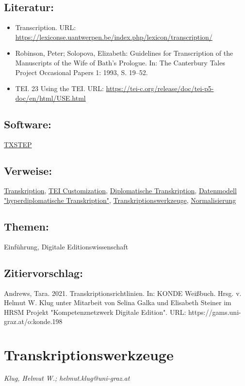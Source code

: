 \documentclass{article}
\begin{document}
        \subsection*{Literatur:}\begin{itemize}\item Transcription. URL: \url{https://lexiconse.uantwerpen.be/index.php/lexicon/transcription/}\item Robinson, Peter; Solopova, Elizabeth: Guidelines for Transcription of the Manuscripts of the
                              Wife of Bath’s Prologue. In: The Canterbury Tales Project Occasional Papers 1: 1993, S. 19–52.\item TEI. 23 Using the TEI. URL: \url{https://tei-c.org/release/doc/tei-p5-doc/en/html/USE.html}\end{itemize}\subsection*{Software:}\href{http://www.txstep.de}{TXSTEP}\subsection*{Verweise:}\href{https://gams.uni-graz.at/o:konde.197}{Transkription}, \href{https://gams.uni-graz.at/o:konde.180}{TEI Customization}, \href{https://gams.uni-graz.at/o:konde.66}{Diplomatische Transkription}, \href{https://gams.uni-graz.at/o:konde.50}{Datenmodell "hyperdiplomatische
                           Transkription"}, \href{https://gams.uni-graz.at/o:konde.199}{Transkriptionswerkzeuge}, \href{https://gams.uni-graz.at/o:konde.146}{Normalisierung}\subsection*{Themen:}Einführung, Digitale Editionswissenschaft\subsection*{Zitiervorschlag:}Andrews, Tara. 2021. Transkriptionsrichtlinien. In: KONDE Weißbuch. Hrsg. v. Helmut W. Klug unter Mitarbeit von Selina Galka und Elisabeth Steiner im HRSM Projekt "Kompetenznetzwerk Digitale Edition". URL: https://gams.uni-graz.at/o:konde.198\newpage\section*{Transkriptionswerkzeuge} \emph{Klug, Helmut W.; helmut.klug@uni-graz.at }\\
        
\end{document}
